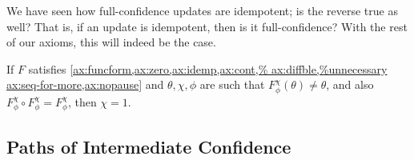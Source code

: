 We have seen how full-confidence updates are idempotent; is the reverse true as well?
That is, if an update is idempotent, then is it full-confidence? 
With the rest of our axioms, this will indeed be the case.

\begin{prop}
	If $F$ satisfies
	\cref{ax:funcform,ax:zero,ax:idemp,ax:cont,%
		ax:diffble,%
		ax:seq-for-more,ax:nopause}
	and
 	 $\theta,\chi,\phi$ are such that 
	$F_\phi^\chi(\theta) \ne \theta$,
	and also
	$F^\chi_\phi \circ F^\chi_\phi = F^\chi_\phi$, then $\chi=1$. 
\end{prop}

% 
% 



\subsection{%
	Paths of Intermediate Confidence
	}

